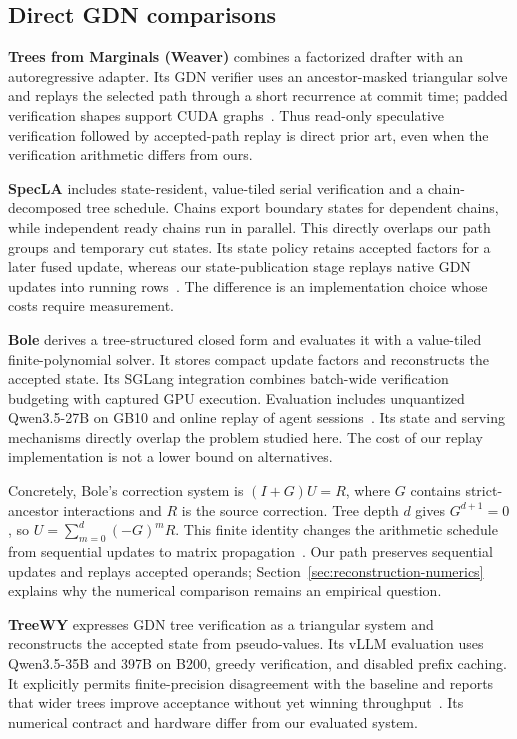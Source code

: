 \documentclass[conference]{IEEEtran}
\begin{document}
\subsection{Direct GDN comparisons}
\textbf{Trees from Marginals (Weaver)} combines a factorized drafter with an autoregressive adapter. Its GDN verifier uses an ancestor-masked triangular solve and replays the selected path through a short recurrence at commit time; padded verification shapes support CUDA graphs~\cite{oda2026marginals}. Thus read-only speculative verification followed by accepted-path replay is direct prior art, even when the verification arithmetic differs from ours.

\textbf{SpecLA} includes state-resident, value-tiled serial verification and a chain-decomposed tree schedule. Chains export boundary states for dependent chains, while independent ready chains run in parallel. This directly overlaps our path groups and temporary cut states. Its state policy retains accepted factors for a later fused update, whereas our state-publication stage replays native GDN updates into running rows~\cite{wang2026specla}. The difference is an implementation choice whose costs require measurement.

\textbf{Bole} derives a tree-structured closed form and evaluates it with a value-tiled finite-polynomial solver. It stores compact update factors and reconstructs the accepted state. Its SGLang integration combines batch-wide verification budgeting with captured GPU execution. Evaluation includes unquantized Qwen3.5-27B on GB10 and online replay of agent sessions~\cite{wang2026bole}. Its state and serving mechanisms directly overlap the problem studied here. The cost of our replay implementation is not a lower bound on alternatives.

Concretely, Bole's correction system is $(I+G)U=R$, where $G$ contains strict-ancestor interactions and $R$ is the source correction. Tree depth $d$ gives $G^{d+1}=0$, so $U=\sum_{m=0}^{d}(-G)^mR$. This finite identity changes the arithmetic schedule from sequential updates to matrix propagation~\cite{wang2026bole}. Our path preserves sequential updates and replays accepted operands; Section~\ref{sec:reconstruction-numerics} explains why the numerical comparison remains an empirical question.

\textbf{TreeWY} expresses GDN tree verification as a triangular system and reconstructs the accepted state from pseudo-values. Its vLLM evaluation uses Qwen3.5-35B and 397B on B200, greedy verification, and disabled prefix caching. It explicitly permits finite-precision disagreement with the baseline and reports that wider trees improve acceptance without yet winning throughput~\cite{ghantasala2026treewy}. Its numerical contract and hardware differ from our evaluated system.
\end{document}
